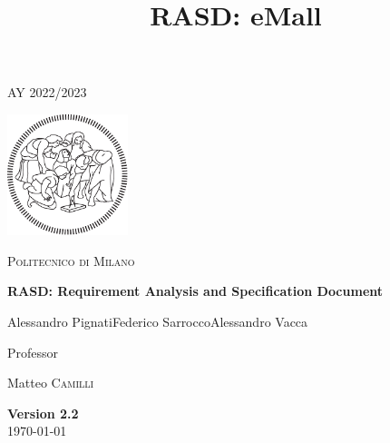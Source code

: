 \documentclass{article}
\title{\textbf{RASD: eMall}}
\begin{document}
\begin{titlepage}
    \centering
    {\scshape\large AY 2022/2023 \par}
    \vfill
    \includegraphics[width=100pt]{img/logo-polimi-new}\par\vspace{1cm}
    {\scshape\LARGE Politecnico di Milano \par}
    \vspace{1.5cm}
    {\huge\bfseries RASD\@: Requirement Analysis
        and Specification Document \par}
    \vspace{2cm}
    {\large {Alessandro Pignati\quad Federico Sarrocco\quad Alessandro Vacca}\par}
    \vfill
    {\large Professor\par
        Matteo \textsc{Camilli}}
    \vfill
    {\large \textbf{Version 2.2}\\ \today \par}
\end{titlepage}
\clearpage
\tableofcontents
{}
\clearpage
{}





\end{document}
